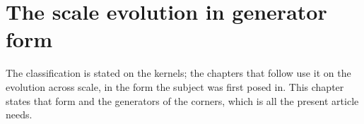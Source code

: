 %
%
%
%

\chapter{The scale evolution in generator form}
\label{ch:generator}

The classification is stated on the kernels; the chapters that follow use it on the evolution
across scale, in the form the subject was first posed in. This chapter states that form and the
generators of the corners, which is all the present article needs.

